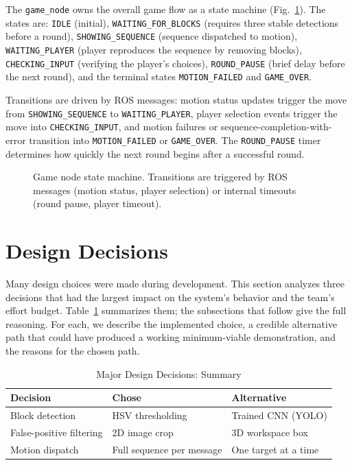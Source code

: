 \documentclass[conference]{IEEEtran}
\begin{document}
The \texttt{game\_node} owns the overall game flow as a state machine
(Fig.~\ref{fig:state_machine}). The states are: \texttt{IDLE} (initial),
\texttt{WAITING\_FOR\_BLOCKS} (requires three stable detections before a
round), \texttt{SHOWING\_SEQUENCE} (sequence dispatched to motion),
\texttt{WAITING\_PLAYER} (player reproduces the sequence by removing
blocks), \texttt{CHECKING\_INPUT} (verifying the player's choices),
\texttt{ROUND\_PAUSE} (brief delay before the next round), and the
terminal states \texttt{MOTION\_FAILED} and \texttt{GAME\_OVER}.

Transitions are driven by ROS messages: motion status updates trigger
the move from \texttt{SHOWING\_SEQUENCE} to \texttt{WAITING\_PLAYER},
player selection events trigger the move into \texttt{CHECKING\_INPUT},
and motion failures or sequence-completion-with-error transition into
\texttt{MOTION\_FAILED} or \texttt{GAME\_OVER}. The
\texttt{ROUND\_PAUSE} timer determines how quickly the next round
begins after a successful round.

\begin{figure}[t]
\centering
\fbox{\rule{0pt}{5cm}\rule{0.85\columnwidth}{0pt}}
\caption{Game node state machine. Transitions are triggered by ROS
messages (motion status, player selection) or internal timeouts
(round pause, player timeout).}
\label{fig:state_machine}
\end{figure}

\section{Design Decisions}
\label{sec:decisions}

Many design choices were made during development. This section
analyzes three decisions that had the largest impact on the system's
behavior and the team's effort budget. Table~\ref{tab:decisions}
summarizes them; the subsections that follow give the full reasoning.
For each, we describe the implemented choice, a credible alternative
path that could have produced a working minimum-viable demonstration,
and the reasons for the chosen path.

\begin{table}[t]
\centering
\caption{Major Design Decisions: Summary}
\label{tab:decisions}
\renewcommand{\arraystretch}{1.2}
\begin{tabular}{p{}p{}p{}}
\toprule
\textbf{Decision} & \textbf{Chose} & \textbf{Alternative} \\
\midrule
Block detection & HSV thresholding & Trained CNN (YOLO) \\
False-positive filtering & 2D image crop & 3D workspace box \\
Motion dispatch & Full sequence per message & One target at a time \\
\bottomrule
\end{tabular}
\end{table}
\end{document}
